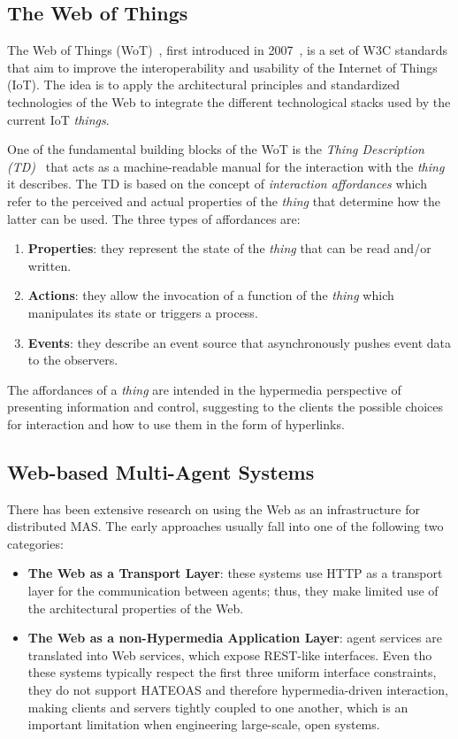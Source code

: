 \subsection{The Web of Things}
The Web of Things (WoT)~\cite{wot}, first introduced in 2007~\cite{guinard2011web}, is a set of W3C standards that aim to improve the interoperability and usability of the Internet of Things (IoT).
The idea is to apply the architectural principles and standardized technologies of the Web to integrate the different technological stacks used by the current IoT \textit{things}.

One of the fundamental building blocks of the WoT is the \textit{Thing Description (TD)}~\cite{wottd} that acts as a machine-readable manual for the interaction with the \textit{thing} it describes.
The TD is based on the concept of \textit{interaction affordances} which refer to the perceived and actual properties of the \textit{thing} that determine how the latter can be used.
The three types of affordances are:
\begin{enumerate}
    \item \textbf{Properties}: they represent the state of the \textit{thing} that can be read and/or written.
    \item \textbf{Actions}: they allow the invocation of a function of the \textit{thing} which manipulates its state or triggers a process.
    \item \textbf{Events}: they describe an event source that asynchronously pushes event data to the observers.
\end{enumerate}
The affordances of a \textit{thing} are intended in the hypermedia perspective of presenting information and control, suggesting to the clients the possible choices for interaction and how to use them in the form of hyperlinks.

\subsection{Web-based Multi-Agent Systems}
There has been extensive research on using the Web as an infrastructure for distributed MAS.
The early approaches usually fall into one of the following two categories:
\begin{itemize}
    \item \textbf{The Web as a Transport Layer}: these systems use HTTP as a transport layer for the communication between agents; thus, they make limited use of the architectural properties of the Web.
    \item \textbf{The Web as a non-Hypermedia Application Layer}: agent services are translated into Web services, which expose REST-like interfaces.
    Even tho these systems typically respect the first three uniform interface constraints, they do not support HATEOAS and therefore hypermedia-driven interaction, making clients and servers tightly coupled to one another, which is an important limitation when engineering large-scale, open systems.
\end{itemize}

